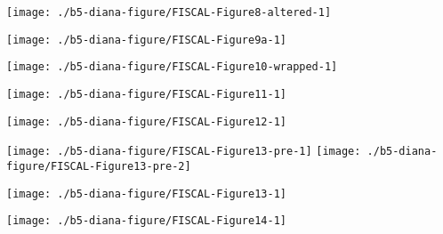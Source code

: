 \documentclass[tikz]{standalone}\usepackage[]{graphicx}\usepackage[]{color}
\newenvironment{knitrout}{}{} %
\begin{document}
\begin{knitrout}
\color{fgcolor}
\texttt{[image: ./b5-diana-figure/FISCAL-Figure8-altered-1]} 

\end{knitrout}

\clearpage
\begin{knitrout}
\color{fgcolor}
\texttt{[image: ./b5-diana-figure/FISCAL-Figure9a-1]} 

\end{knitrout}
\clearpage

\begin{knitrout}
\color{fgcolor}
\texttt{[image: ./b5-diana-figure/FISCAL-Figure10-wrapped-1]} 

\end{knitrout}

\clearpage
\begin{knitrout}
\color{fgcolor}
\texttt{[image: ./b5-diana-figure/FISCAL-Figure11-1]} 

\end{knitrout}

\begin{knitrout}
\color{fgcolor}
\texttt{[image: ./b5-diana-figure/FISCAL-Figure12-1]} 

\end{knitrout}


\clearpage

\begin{knitrout}
\color{fgcolor}
\texttt{[image: ./b5-diana-figure/FISCAL-Figure13-pre-1]} 
\texttt{[image: ./b5-diana-figure/FISCAL-Figure13-pre-2]} 

\end{knitrout}
\begin{knitrout}
\color{fgcolor}
\texttt{[image: ./b5-diana-figure/FISCAL-Figure13-1]} 

\end{knitrout}


\clearpage
\begin{knitrout}
\color{fgcolor}
\texttt{[image: ./b5-diana-figure/FISCAL-Figure14-1]} 

\end{knitrout}
\end{document}
